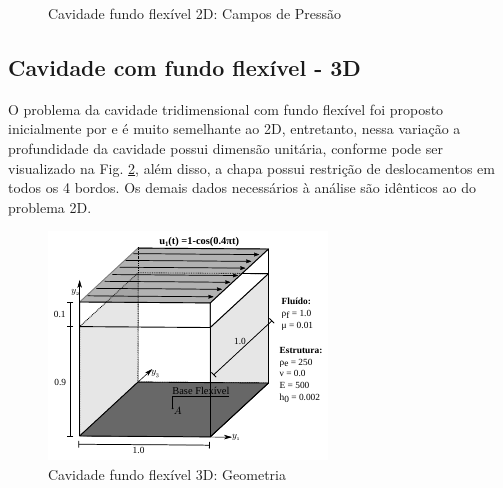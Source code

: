 \documentclass[tese_patricia]{subfiles}
\begin{document}
\begin{figure}[htb!]
	\caption{Cavidade fundo flexível 2D: Campos de Pressão}
	\label{fig:cavidadeFF2d_pressão}
\end{figure}



\subsection{Cavidade com fundo flexível - 3D}

O problema da cavidade tridimensional com fundo flexível foi proposto inicialmente por  e é muito semelhante ao 2D, entretanto, nessa variação a profundidade da cavidade possui dimensão unitária, conforme pode ser visualizado na Fig. \ref{fig:cavidadeFF3d_Geometria}, além disso, a chapa possui restrição de deslocamentos em todos os 4 bordos. Os demais dados necessários à análise são idênticos ao do problema 2D.

\begin{figure}[htb!]
	\centering 
	\includegraphics[scale=2.0,trim=0cm 0cm 0cm 0cm, clip=true]{Imagens/Cap7/cav3d.pdf}	
	\caption{Cavidade fundo flexível 3D: Geometria}
	\label{fig:cavidadeFF3d_Geometria}
\end{figure}
\end{document}
